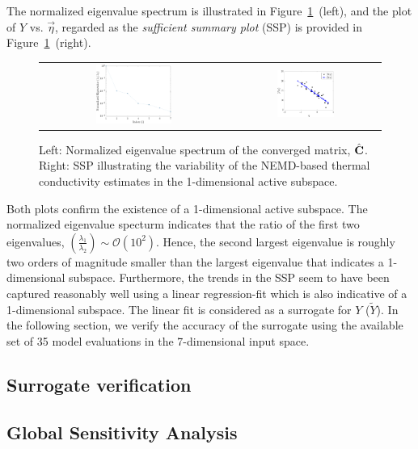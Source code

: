 The normalized eigenvalue spectrum is illustrated
in Figure~\ref{fig:casfig2}~(left), and the plot of $Y$ vs. $\vec\eta$, regarded as the \textit{sufficient
summary plot} (SSP) is provided in Figure~\ref{fig:casfig2}~(right). 
%
\begin{figure}[htbp]
\begin{center}
\begin{tabular}{cc}
  \includegraphics[width=0.42\textwidth]{./Figures/eig_spec}
  &
  \hspace{3mm}
  \includegraphics[width=0.4\textwidth]{./Figures/free_ssp1D}
  \end{tabular}
\caption{Left: Normalized eigenvalue spectrum of the converged matrix, $\hat{\mathbf{{C}}}$. Right: SSP
illustrating the variability of the NEMD-based thermal conductivity estimates in the 1-dimensional
active subspace.}
\label{fig:casfig2}
\end{center}
\end{figure}
%
Both plots confirm the existence of a 1-dimensional active subspace. The normalized eigenvalue specturm
indicates that the ratio of the first two eigenvalues, $\left(\frac{\lambda_1}{\lambda_2}\right)\sim\mathcal{O}(10^2)$.
Hence, the second largest eigenvalue is roughly two orders of magnitude smaller than the largest eigenvalue that
indicates a 1-dimensional subspace. Furthermore, the trends in the SSP seem to have been captured
reasonably well using a linear regression-fit which is also indicative of a 1-dimensional subspace. The linear 
fit is considered as a surrogate for $Y$ ($\tilde{Y}$). In the following section, we verify the accuracy of the
surrogate using the available set of 35 model evaluations in the 7-dimensional input space. 


\subsection{Surrogate verification}
\label{sub:ver}


\subsection{Global Sensitivity Analysis}
\label{sub:gsa}
